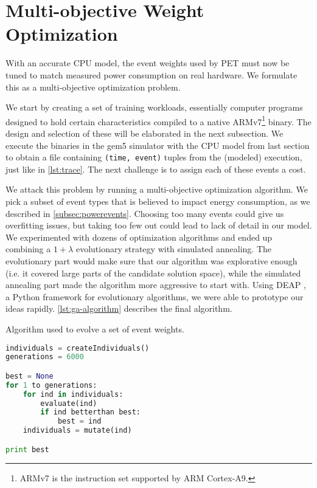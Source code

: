 \section{Multi-objective Weight Optimization}
\label{sec:multiobjective}

With an accurate CPU model, the event weights used by PET must now be tuned to
match measured power consumption on real hardware. We formulate this as a
multi-objective optimization problem.

We start by creating a set of training workloads, essentially computer programs
designed to hold certain characteristics compiled to a native
ARMv7\footnote{ARMv7 is the instruction set supported by ARM Cortex-A9.} binary.
The design and selection of these will be elaborated in the next subsection. We
execute the binaries in the gem5 simulator with the CPU model from last section
to obtain a file containing \texttt{(time, event)} tuples from the (modeled)
execution, just like in \autoref{lst:trace}. The next challenge is to assign
each of these events a cost.

We attack this problem by running a multi-objective optimization algorithm. We
pick a subset of event types that is believed to impact energy consumption, as
we described in \autoref{subsec:powerevents}. Choosing too many events could
give us overfitting issues, but taking too few out could lead to lack of detail
in our model. We experimented with dozens of optimization algorithms and ended
up combining a $1 + \lambda$ evolutionary strategy with simulated annealing. The
evolutionary part would make sure that our algorithm was explorative enough
(i.e. it covered large parts of the candidate solution space), while the
simulated annealing part made the algorithm more aggressive to start with. Using
DEAP \cite{DEAP_JMLR2012}, a Python framework for evolutionary algorithms, we
were able to prototype our ideas rapidly. \autoref{lst:ga-algorithm} describes
the final algorithm.

\begin{algorithm}[tb]
\caption{Algorithm used to evolve a set of event weights.}
\label{lst:ga-algorithm}
\begin{lstlisting}[language=python,style=algo]
individuals = createIndividuals()
generations = 6000

best = None
for 1 to generations:
    for ind in individuals:
        evaluate(ind)
        if ind betterthan best:
            best = ind
    individuals = mutate(ind)

print best
\end{lstlisting}
\end{algorithm}

